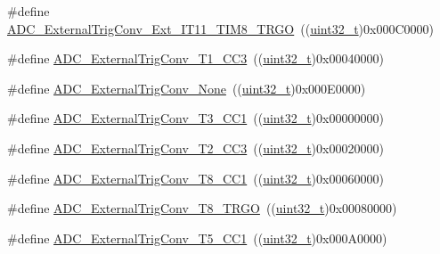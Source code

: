 \begin{DoxyCompactItemize}
\#define \hyperlink{group___a_d_c__external__trigger__sources__for__regular__channels__conversion_ga640de59aeac8cc3d96b6db3497975d02}{A\+D\+C\+\_\+\+External\+Trig\+Conv\+\_\+\+Ext\+\_\+\+I\+T11\+\_\+\+T\+I\+M8\+\_\+\+T\+R\+GO}~((\hyperlink{_p_e___types_8h_a33594304e786b158f3fb30289278f5af}{uint32\+\_\+t})0x000\+C0000)
\item 
\#define \hyperlink{group___a_d_c__external__trigger__sources__for__regular__channels__conversion_ga41ad03e2921f6de0fb75ae06d6046e63}{A\+D\+C\+\_\+\+External\+Trig\+Conv\+\_\+\+T1\+\_\+\+C\+C3}~((\hyperlink{_p_e___types_8h_a33594304e786b158f3fb30289278f5af}{uint32\+\_\+t})0x00040000)
\item 
\#define \hyperlink{group___a_d_c__external__trigger__sources__for__regular__channels__conversion_ga433a3845ed1792fa6359b763c955e9c2}{A\+D\+C\+\_\+\+External\+Trig\+Conv\+\_\+\+None}~((\hyperlink{_p_e___types_8h_a33594304e786b158f3fb30289278f5af}{uint32\+\_\+t})0x000\+E0000)
\item 
\#define \hyperlink{group___a_d_c__external__trigger__sources__for__regular__channels__conversion_ga3c73d5c8bb0f898dbbc74bcc536f6ec1}{A\+D\+C\+\_\+\+External\+Trig\+Conv\+\_\+\+T3\+\_\+\+C\+C1}~((\hyperlink{_p_e___types_8h_a33594304e786b158f3fb30289278f5af}{uint32\+\_\+t})0x00000000)
\item 
\#define \hyperlink{group___a_d_c__external__trigger__sources__for__regular__channels__conversion_ga16ae1b335f2c2b4facf3d4bedc2ce27f}{A\+D\+C\+\_\+\+External\+Trig\+Conv\+\_\+\+T2\+\_\+\+C\+C3}~((\hyperlink{_p_e___types_8h_a33594304e786b158f3fb30289278f5af}{uint32\+\_\+t})0x00020000)
\item 
\#define \hyperlink{group___a_d_c__external__trigger__sources__for__regular__channels__conversion_ga97af875d12e77a67e84f3aaf1f8033ed}{A\+D\+C\+\_\+\+External\+Trig\+Conv\+\_\+\+T8\+\_\+\+C\+C1}~((\hyperlink{_p_e___types_8h_a33594304e786b158f3fb30289278f5af}{uint32\+\_\+t})0x00060000)
\item 
\#define \hyperlink{group___a_d_c__external__trigger__sources__for__regular__channels__conversion_gab26d94590d47ae6ec46841652741abf3}{A\+D\+C\+\_\+\+External\+Trig\+Conv\+\_\+\+T8\+\_\+\+T\+R\+GO}~((\hyperlink{_p_e___types_8h_a33594304e786b158f3fb30289278f5af}{uint32\+\_\+t})0x00080000)
\item 
\#define \hyperlink{group___a_d_c__external__trigger__sources__for__regular__channels__conversion_ga6bd1ad69cb455afeabf6759b640378d3}{A\+D\+C\+\_\+\+External\+Trig\+Conv\+\_\+\+T5\+\_\+\+C\+C1}~((\hyperlink{_p_e___types_8h_a33594304e786b158f3fb30289278f5af}{uint32\+\_\+t})0x000\+A0000)

\end{DoxyCompactItemize}
